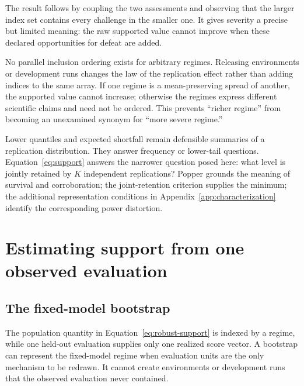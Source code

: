 \documentclass[11pt]{article}
\theoremstyle{remark}
\begin{document}
The result follows by coupling the two assessments and observing that the larger index set contains every challenge in the smaller one. It gives severity a precise but limited meaning: the raw supported value cannot improve when these declared opportunities for defeat are added.

No parallel inclusion ordering exists for arbitrary regimes. Releasing environments or development runs changes the law of the replication effect rather than adding indices to the same array. If one regime is a mean-preserving spread of another, the supported value cannot increase; otherwise the regimes express different scientific claims and need not be ordered. This prevents ``richer regime'' from becoming an unexamined synonym for ``more severe regime.''

Lower quantiles and expected shortfall remain defensible summaries of a replication distribution. They answer frequency or lower-tail questions. Equation~\eqref{eq:support} answers the narrower question posed here: what level is jointly retained by $K$ independent replications? Popper grounds the meaning of survival and corroboration; the joint-retention criterion supplies the minimum; the additional representation conditions in Appendix~\ref{app:characterization} identify the corresponding power distortion.

\section{Estimating support from one observed evaluation}
\label{sec:estimation}

\subsection{The fixed-model bootstrap}

The population quantity in Equation~\eqref{eq:robust-support} is indexed by a regime, while one held-out evaluation supplies only one realized score vector. A bootstrap can represent the fixed-model regime when evaluation units are the only mechanism to be redrawn. It cannot create environments or development runs that the observed evaluation never contained.
\end{document}
